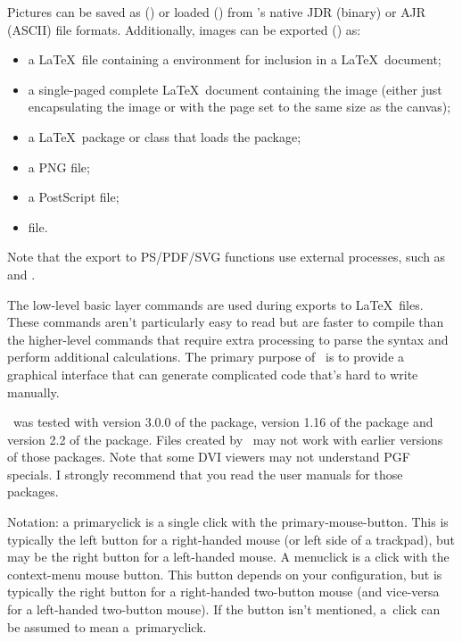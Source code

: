 Pictures can be saved as () or loaded
() from \FlowframTk's native \gls{JDR}
(binary) or \gls{AJR} (ASCII) file formats. Additionally, images can be
exported () as:

\begin{itemize}
    \item a \LaTeX\ file containing a  environment
    for inclusion in a \LaTeX\ document;

    \item a single-paged complete \LaTeX\ document containing the image
    (either just encapsulating the image or with the page set to the
    same size as the \gls{canvas});

    \item a \LaTeX\ package or class that loads the  package;

    \item a PNG file;

    \item a PostScript file;

    \item {} file.
\end{itemize}

Note that the export to PS/PDF/SVG functions use external
processes, such as  and .

The low-level  basic layer commands are used during
exports to \LaTeX\ files. These commands aren't particularly easy to
read but are faster to compile than the higher-level commands that
require extra processing to parse the syntax and perform additional
calculations. The primary purpose of \FlowframTk\ is to provide a
graphical interface that can generate complicated code that's hard
to write manually.

\FlowframTk\ was tested with version 3.0.0 of the 
package, version 1.16 of the  package and version
2.2 of the  package. Files created by \FlowframTk\
may not work with earlier versions of those packages. Note that some
DVI viewers may not understand PGF specials. I strongly recommend
that you read the user manuals for those packages.


Notation: a \gls{primaryclick} is a single click with the
\gls{primary-mouse-button}. This is typically the left button for a
right-handed mouse (or left side of a trackpad), but may be the
right button for a left-handed mouse. A \gls{menuclick} is a click
with the \gls{context-menu} mouse button. This button depends on your
configuration, but is typically the right button for a right-handed
two-button mouse (and vice-versa for a left-handed two-button mouse). 
If the button isn't mentioned, a~\gls{click} can
be assumed to mean a~\gls{primaryclick}.

